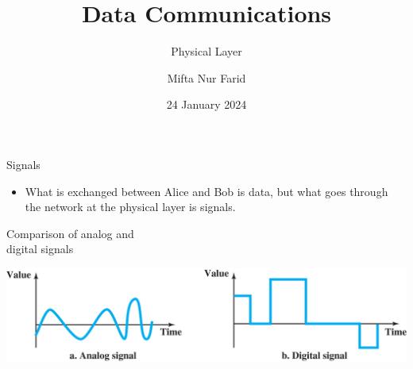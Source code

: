 \documentclass[pdflatex,compress]{beamer}
\title{Data Communications}
\subtitle{Physical Layer}
\author{Mifta Nur Farid}
\date{24 January 2024}
\begin{document}
\maketitle


\begin{frame}{Signals}
	\begin{itemize}
		\item What is exchanged between Alice and Bob is data, but what goes through the network at the physical layer is signals.
	\end{itemize}
\end{frame}

\begin{frame}{Comparison of analog and\\digital signals}
	\begin{center}
		\includegraphics[width=\linewidth]{img/02}
	\end{center}
\end{frame}
\end{document}
